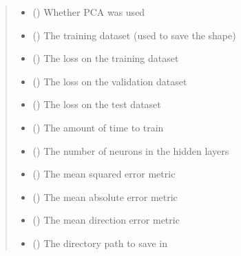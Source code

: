 \documentclass[letterpaper,10pt,english]{sphinxmanual}
\begin{document}
\begin{fulllineitems}
\begin{quote}
\begin{description}
\begin{itemize}
\item {} 
 () \textendash{} Whether PCA was used

\item {} 
 () \textendash{} The training dataset (used to save the shape)

\item {} 
 () \textendash{} The loss on the training dataset

\item {} 
 () \textendash{} The loss on the validation dataset

\item {} 
 () \textendash{} The loss on the test dataset

\item {} 
 () \textendash{} The amount of time to train

\item {} 
 () \textendash{} The number of neurons in the hidden layers

\item {} 
 () \textendash{} The mean squared error metric

\item {} 
 () \textendash{} The mean absolute error metric

\item {} 
 () \textendash{} The mean direction error metric

\item {} 
 () \textendash{} The directory path to save in

\end{itemize}

\end{description}\end{quote}

\end{fulllineitems}
\end{document}
